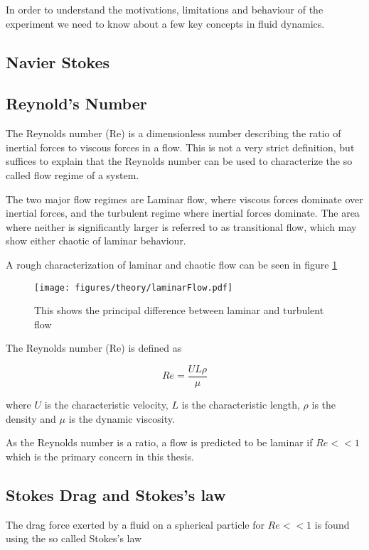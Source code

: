 
In order to understand the motivations, limitations and behaviour of the experiment we need to know about a few key concepts in fluid dynamics.

\subsection{Navier Stokes}


\subsection{Reynold's Number}
The Reynolds number (Re) is a dimensionless number describing the ratio of inertial forces to viscous forces in a flow. This is not a very strict definition, but suffices to explain that the Reynolds number can be used to characterize the so called flow regime of a system. 

The two major flow regimes are Laminar flow, where viscous forces dominate over inertial forces, and the turbulent regime where inertial forces dominate. The area where neither is significantly larger is referred to as transitional flow, which may show either chaotic of laminar behaviour. 

A rough characterization of laminar and chaotic flow can be seen in figure \ref{fig:laminar_flow}

\begin{figure}
\centering
\texttt{[image: figures/theory/laminarFlow.pdf]}
\caption{This shows the principal difference between laminar and turbulent flow}
\label{fig:laminar_flow}
\end{figure}

The Reynolds number (Re) is defined as \cite{introfluid}

\begin{equation}\label{eq:reynolds}
Re = \frac{U L \rho}{\mu}
\end{equation}

where $U$ is the characteristic velocity, $L$ is the characteristic length, $\rho$ is the density and $\mu$ is the dynamic viscosity. 

As the Reynolds number is a ratio, a flow is predicted to be laminar if $Re << 1$ which is the primary concern in this thesis.

\subsection{Stokes Drag and Stokes's law}
The drag force exerted by a fluid on a spherical particle for $Re << 1$ is found using the so called Stokes's law \cite{introfluid2}

